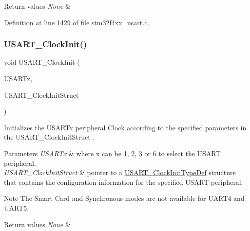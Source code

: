 \begin{DoxyRetVals}{Return values}
{\em None} & \\
\hline
\end{DoxyRetVals}


Definition at line 1429 of file stm32f4xx\+\_\+usart.\+c.

\mbox{\label{group___u_s_a_r_t_gadb50c7a2175c91acd3728f8eefd0c63d}} 
\subsubsection{\texorpdfstring{U\+S\+A\+R\+T\+\_\+\+Clock\+Init()}{USART\_ClockInit()}}
{\footnotesize\ttfamily void U\+S\+A\+R\+T\+\_\+\+Clock\+Init (\begin{DoxyParamCaption}\item[{\hyperlink{struct_u_s_a_r_t___type_def}{U\+S\+A\+R\+T\+\_\+\+Type\+Def} $\ast$}]{U\+S\+A\+R\+Tx,  }\item[{\hyperlink{struct_u_s_a_r_t___clock_init_type_def}{U\+S\+A\+R\+T\+\_\+\+Clock\+Init\+Type\+Def} $\ast$}]{U\+S\+A\+R\+T\+\_\+\+Clock\+Init\+Struct }\end{DoxyParamCaption})}



Initializes the U\+S\+A\+R\+Tx peripheral Clock according to the specified parameters in the U\+S\+A\+R\+T\+\_\+\+Clock\+Init\+Struct . 


\begin{DoxyParams}{Parameters}
{\em U\+S\+A\+R\+Tx} & where x can be 1, 2, 3 or 6 to select the U\+S\+A\+RT peripheral. \\
\hline
{\em U\+S\+A\+R\+T\+\_\+\+Clock\+Init\+Struct} & pointer to a \hyperlink{struct_u_s_a_r_t___clock_init_type_def}{U\+S\+A\+R\+T\+\_\+\+Clock\+Init\+Type\+Def} structure that contains the configuration information for the specified U\+S\+A\+RT peripheral. \\
\hline
\end{DoxyParams}
\begin{DoxyNote}{Note}
The Smart Card and Synchronous modes are not available for U\+A\+R\+T4 and U\+A\+R\+T5. 
\end{DoxyNote}

\begin{DoxyRetVals}{Return values}
{\em None} & \\
\hline
\end{DoxyRetVals}


